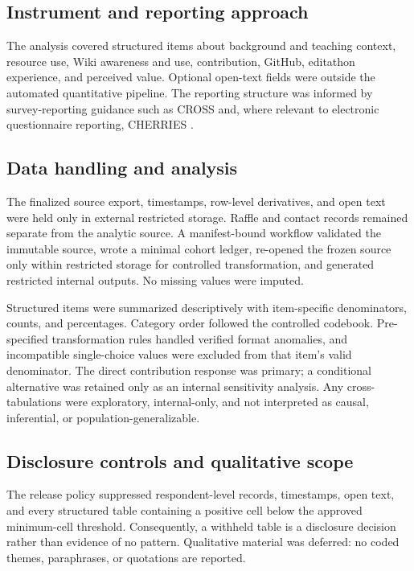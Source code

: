 \documentclass[11pt]{article}
\begin{document}
\subsection{Instrument and reporting approach}

The analysis covered structured items about background and teaching context,
resource use, Wiki awareness and use, contribution, GitHub, editathon
experience, and perceived value. Optional open-text fields were outside the
automated quantitative pipeline. The reporting structure was informed by
survey-reporting guidance such as CROSS and, where relevant to electronic
questionnaire reporting, CHERRIES \cite{cross,cherries}.

\subsection{Data handling and analysis}

The finalized source export, timestamps, row-level derivatives, and open text
were held only in external restricted storage. Raffle and contact records
remained separate from the analytic source. A manifest-bound workflow validated
the immutable source, wrote a minimal cohort ledger, re-opened the frozen source
only within restricted storage for controlled transformation, and generated
restricted internal outputs. No missing values were imputed.

Structured items were summarized descriptively with item-specific denominators,
counts, and percentages. Category order followed the controlled codebook.
Pre-specified transformation rules handled verified format anomalies, and
incompatible single-choice values were excluded from that item's valid
denominator. The direct contribution response was primary; a conditional
alternative was retained only as an internal sensitivity analysis. Any
cross-tabulations were exploratory, internal-only, and not interpreted as
causal, inferential, or population-generalizable.

\subsection{Disclosure controls and qualitative scope}

The release policy suppressed respondent-level records, timestamps, open text,
and every structured table containing a positive cell below the approved
minimum-cell threshold. Consequently, a withheld table is a disclosure decision
rather than evidence of no pattern. Qualitative material was deferred: no
coded themes, paraphrases, or quotations are reported.
\end{document}
